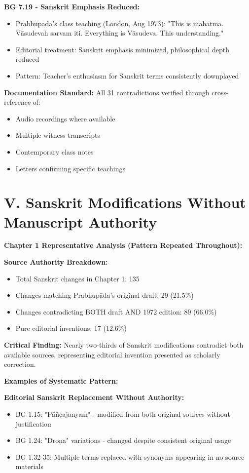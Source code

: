 \documentclass[11pt,twoside]{book}
\begin{document}
\textbf{\textbf{BG 7.19 - Sanskrit Emphasis Reduced:}}
\begin{itemize}
\item Prabhupāda's class teaching (London, Aug 1973): "This is mahātmā. Vāsudevah sarvam iti. Everything is Vāsudeva. This understanding."
\item Editorial treatment: Sanskrit emphasis minimized, philosophical depth reduced
\item Pattern: Teacher's enthusiasm for Sanskrit terms consistently downplayed
\end{itemize}

\textbf{\textbf{Documentation Standard:}}
All 31 contradictions verified through cross-reference of:
\begin{itemize}
\item Audio recordings where available
\item Multiple witness transcripts
\item Contemporary class notes
\item Letters confirming specific teachings
\end{itemize}
\section*{V. Sanskrit Modifications Without Manuscript Authority}
\label{sec:org8e7f4a3}

\textbf{\textbf{Chapter 1 Representative Analysis (Pattern Repeated Throughout):}}

\textbf{\textbf{Source Authority Breakdown:}}
\begin{itemize}
\item Total Sanskrit changes in Chapter 1: 135
\item Changes matching Prabhupāda's original draft: 29 (21.5\%)
\item Changes contradicting BOTH draft AND 1972 edition: 89 (66.0\%)
\item Pure editorial inventions: 17 (12.6\%)
\end{itemize}

\textbf{\textbf{Critical Finding:}} Nearly two-thirds of Sanskrit modifications contradict both available sources, representing editorial invention presented as scholarly correction.

\textbf{\textbf{Examples of Systematic Pattern:}}

\textbf{\textbf{Editorial Sanskrit Replacement Without Authority:}}
\begin{itemize}
\item BG 1.15: "Pāñcajanyam" - modified from both original sources without justification
\item BG 1.24: "Droṇa" variations - changed despite consistent original usage
\item BG 1.32-35: Multiple terms replaced with synonyms appearing in no source materials
\end{itemize}
\end{document}
